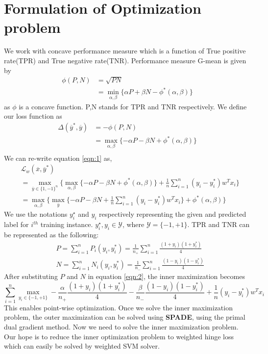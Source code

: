 \documentclass{article} %
\begin{document}
\section{Formulation of Optimization problem}
We work with concave performance measure which is a function of True positive rate(TPR) and True negative rate(TNR). Performance measure G-mean is given by
\begin{align*}
\phi(P,N) &=\sqrt{PN}\\
& = \min_{\alpha,\beta}\{\alpha P+\beta N - \phi^*(\alpha,\beta)\}
\end{align*}
as $\phi$ is a concave function. P,N stands for TPR and TNR respectively. We define our loss function as
\begin{align*}
\Delta(\overline{y}^*,\overline{y}) &= -\phi(P,N) \\
&= \max_{\alpha,\beta}\{-\alpha P-\beta N + \phi^*(\alpha,\beta)\}\\
\end{align*}
We can re-write equation \ref{eqn:1} as,
\begin{align}
\label{eqn:2}
&\mathcal L_w(\overline{x},\overline{y}^*)\nonumber\\
&=\max_{\overline{y}\in\{1,-1\}^n}\{\max_{\alpha,\beta}\{-\alpha P-\beta N +\phi^*(\alpha,\beta)\} + \frac{1}{n}\sum_{i=1}^n (y_i - y_i^*)w^Tx_i\}\nonumber\\
&=\max_{\alpha,\beta}\{\max_{\overline{y}}\{-\alpha P-\beta N  + \frac{1}{n}\sum_{i=1}^n (y_i - y_i^*)w^Tx_i\}+\phi^*(\alpha,\beta)\}
\end{align}
We use the notations $y_i^{\star}$ and $y_i$ respectively representing the given and predicted label for $i^{th}$ training instance. $y_i^{\star},y_i\in\mathcal{Y}$, where $\mathcal{Y}=\{-1,+1\}$. TPR and TNR can be represented as the following:
\begin{align*}
&P = \sum_{i=1}^nP_i(y_i,y_i^*)= \frac{1}{n_+}\sum_{i=1}^n\frac{(1+y_i)(1+y_i^*)}{4}\\
&N = \sum_{i=1}^nN_i(y_i,y_i^*)= \frac{1}{n_-}\sum_{i=1}^n\frac{(1-y_i)(1-y_i^*)}{4}
\end{align*}
After substituting $P$ and $N$ in equation \ref{eqn:2}, the inner maximization becomes
\begin{equation}
\sum_{i=1}^n\max_{y_i\in\{-1,+1\}}-\frac{\alpha}{n_+}\frac{(1+y_i)(1+y_i^*)}{4} - \frac{\beta}{n_-}\frac{(1-y_i)(1-y_i^*)}{4} + \frac{1}{n}(y_i - y_i^*)w^Tx_i
\end{equation}
This enables point-wise optimization. Once we solve the inner maximization problem, the outer maximization can be solved using \textbf{SPADE}\cite{c2}, using the primal dual gradient method. Now we need to solve the inner maximization problem. Our hope is to reduce the inner optimization problem to weighted hinge loss which can easily be solved by weighted SVM solver.
\end{document}
